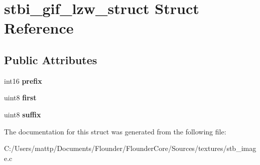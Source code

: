 \hypertarget{structstbi__gif__lzw__struct}{}\section{stbi\+\_\+gif\+\_\+lzw\+\_\+struct Struct Reference}
\label{structstbi__gif__lzw__struct}
\subsection*{Public Attributes}
\begin{DoxyCompactItemize}
\item 
\mbox{\label{structstbi__gif__lzw__struct_a0e5142cb4117b905eb9efd73c436525c}} 
int16 {\bfseries prefix}
\item 
\mbox{\label{structstbi__gif__lzw__struct_a08129c445d56c0983285d6e0e71b83bd}} 
uint8 {\bfseries first}
\item 
\mbox{\label{structstbi__gif__lzw__struct_a3ec7f462268018489345b79b2f123764}} 
uint8 {\bfseries suffix}
\end{DoxyCompactItemize}


The documentation for this struct was generated from the following file\+:\begin{DoxyCompactItemize}
\item 
C\+:/\+Users/mattp/\+Documents/\+Flounder/\+Flounder\+Core/\+Sources/textures/stb\+\_\+image.\+c\end{DoxyCompactItemize}
